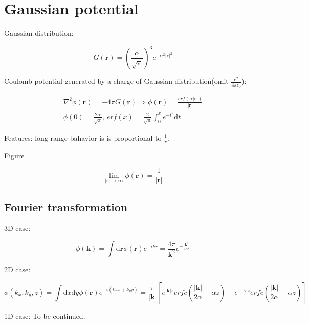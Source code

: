 \section{Gaussian potential}

\noindent
Gaussian distribution:

\begin{equation}\label{Gaussian-distribution}
    G(\boldsymbol{r}) = \left( \frac{\alpha}{\sqrt{\pi}} \right)^{3} e^{-\alpha^2|\boldsymbol{r}|^2}
\end{equation}

\noindent
Coulomb potential generated by a charge of Gaussian distribution(omit $\frac{e^2}{4\pi\epsilon_0}$):

\begin{equation}\label{Gaussian-potential}
    \begin{gathered}
        \nabla^{2} \phi(\boldsymbol{r}) = - 4\pi G(\boldsymbol{r}) 
        \Rightarrow \phi(\boldsymbol{r}) = \frac{erf(\alpha |\boldsymbol{r}|)}{|\boldsymbol{r}|} \\
        \phi(0) = \frac{2\alpha}{\sqrt{\pi}} ,\,
        erf(x) = \frac{2}{\sqrt{\pi}} \int_{0}^{x} e^{-t^2} \mathrm{d}t 
    \end{gathered}
\end{equation}

\noindent
Features: long-range bahavior is is proportional to $\frac{1}{r}$.

Figure


\begin{equation}
    \lim_{|\boldsymbol{r}| \rightarrow \infty} \phi(\boldsymbol{r}) = \frac{1}{|\boldsymbol{r}|}
\end{equation}

\subsection{Fourier transformation}

\noindent
3D case:

\begin{equation}\label{Gaussian-potential-Fourier-3D}
    \phi(\boldsymbol{k}) = \int \mathrm{d}\boldsymbol{r} \phi(\boldsymbol{r}) e^{-ikr}
    = \frac{4\pi}{\boldsymbol{k}^2} e^{-\frac{\boldsymbol{k}^2}{4\alpha^2}}
\end{equation}

\noindent
2D case:

\begin{equation}\label{Gaussian-potential-Fourier-2D}
    \phi(k_x,k_y,z) = \int \mathrm{d}x \mathrm{d}y \phi(\boldsymbol{r}) e^{-i(k_xx+k_yy)}
    = \frac{\pi}{|\boldsymbol{k}|} \left[ 
        e^{|\boldsymbol{k}|z} erfc(\frac{|\boldsymbol{k}|}{2\alpha} 
        + \alpha z) + e^{-|\boldsymbol{k}|z} erfc(\frac{|\boldsymbol{k}|}{2\alpha} - \alpha z) 
        \right] 
\end{equation}

\noindent
1D case: To be continued.

